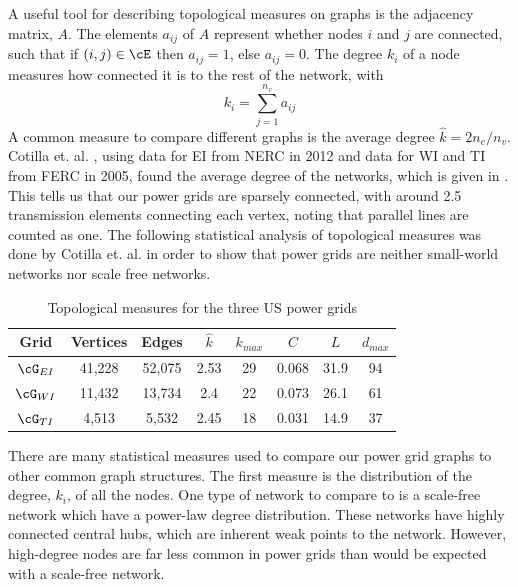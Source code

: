 A useful tool for describing topological measures on graphs is the adjacency matrix, $A$.  The elements $a_{ij}$ of $A$ represent whether nodes $i$ and $j$ are connected, such that if $(i,j) \in \cE$ then $a_{ij} = 1$, else $a_{ij}=0$.  The degree $k_i$ of a node measures how connected it is to the rest of the network, with
\begin{equation}
k_i = \sum_{j=1}^{n_v} a_{ij}
\end{equation}
A common measure to compare different graphs is the average degree $\hat{k} = 2 n_e/n_v$.  Cotilla et. al. \cite{cotilla_2012}, using data for EI from NERC in 2012 and data for WI and TI from FERC in 2005, found the average degree of the networks, which is given in .  This tells us that our power grids are sparsely connected, with around 2.5 transmission elements connecting each vertex, noting that parallel lines are counted as one.  The following statistical analysis of topological measures was done by Cotilla et. al. \cite{cotilla_2012} in order to show that power grids are neither small-world networks nor scale free networks.

\begin{table}
\centering
\begin{tabular}{| c | c c c c c c c|}
\hline
Grid & Vertices & Edges & $\hat{k}$  &  $k_{max}$ & $C$ & $L$ & $d_{max}$ \\
\hline
$\cG_{EI}$	& 41,228	&	52,075	&	2.53	&	29	&	0.068	&	31.9	&	94	\\
$\cG_{WI}$	& 11,432	&	13,734	&	2.4	&	22	&	0.073	&	26.1	&	61	\\
$\cG_{TI}$ 	& 4,513	&	5,532		&	2.45	&	18	&	0.031	&	14.9	&	37	\\
\hline
\end{tabular}
\caption{Topological measures for the three US power grids}
\label{tab:topo_info}
\end{table}


There are many statistical measures used to compare our power grid graphs to other common graph structures.  The first measure is the distribution of the degree, $k_i$, of all the nodes.  One type of network to compare to is a scale-free network which have a power-law degree distribution.  These networks have highly connected central hubs, which are inherent weak points to the network.  However, high-degree nodes are far less common in power grids than would be expected with a scale-free network.    

